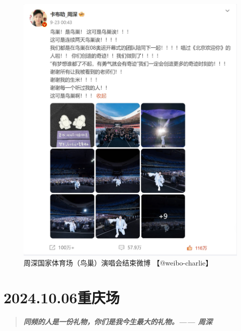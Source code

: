 \documentclass[]{ctexbook}
\begin{document}
\begin{figure}

{\centering \includegraphics{img/weibo/beijing-20240923} 

}

\caption{周深国家体育场（鸟巢）演唱会结束微博 【@weibo-charlie】}\label{fig:unnamed-chunk-110}
\end{figure}

\chapter{2024.10.06重庆场}\label{chongqing-20241006}

\begin{quote}
\textbf{\emph{同频的人是一份礼物，你们是我今生最大的礼物。------ 周深}}
\end{quote}
\end{document}
